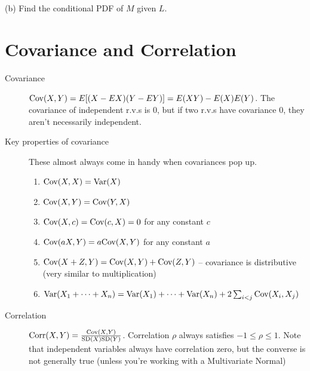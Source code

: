 \documentclass{article}
\begin{document}
(b) Find the conditional PDF of $M$ given $L$.


\section{Covariance and Correlation}

\begin{description}

\item[Covariance] $\textrm{Cov}(X, Y) = E[(X - EX)(Y - EY)] = E(XY) - E(X)E(Y)$. The covariance of independent r.v.s is 0, but if two r.v.s have covariance 0, they aren't necessarily independent.

\item[Key properties of covariance] These almost always come in handy when covariances pop up.

    \begin{enumerate}
        \item $\textrm{Cov}(X, X) = \textrm{Var}(X)$
        
        \item $\textrm{Cov}(X, Y) = \textrm{Cov}(Y, X)$
        
        \item $\textrm{Cov}(X, c) = \textrm{Cov}(c, X) = 0$ for any constant $c$
        
        \item $\textrm{Cov}(aX, Y) = a\textrm{Cov}(X, Y)$ for any constant $a$
        
        \item $\textrm{Cov}(X + Z, Y) = \textrm{Cov}(X, Y) + \textrm{Cov}(Z, Y)$ -- covariance is distributive (very similar to multiplication)
        
        \item $\textrm{Var}(X_1 + \dots + X_n) = \textrm{Var}(X_1) + \dots + \textrm{Var}(X_n) + 2\sum_{i < j} \textrm{Cov}(X_i, X_j)$
    \end{enumerate}

\item[Correlation] $\textrm{Corr}(X, Y) = \frac{\textrm{Cov}(X, Y)}{\textrm{SD}(X)\textrm{SD}(Y)}$. Correlation $\rho$ always satisfies $-1 \leq \rho \leq 1$. Note that independent variables always have correlation zero, but the converse is not generally true (unless you're working with a Multivariate Normal)

\end{description}
\end{document}
